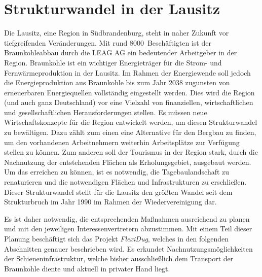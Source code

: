 \section{Strukturwandel in der Lausitz}

Die Lausitz, eine Region in Südbrandenburg, steht in naher Zukunft vor tiefgreifenden Veränderungen. Mit rund 8000~Beschäftigten \cite{noauthor_braunkohle_nodate} ist der Braunkohleabbau durch die LEAG AG ein bedeutender Arbeitgeber in der Region. Braunkohle ist ein wichtiger Energieträger für die Strom- und Fernwärmeproduktion in der Lausitz. Im Rahmen der Energiewende soll jedoch die Energieproduktion aus Braunkohle bis zum Jahr 2038 zugunsten von erneuerbaren Energiequellen vollständig eingestellt werden. Dies wird die Region (und auch ganz Deutschland) vor eine Vielzahl von finanziellen, wirtschaftlichen und gesellschaftlichen Herausforderungen stellen. Es müssen neue Wirtschaftskonzepte für die Region entwickelt werden, um diesen Strukturwandel zu bewältigen. Dazu zählt zum einen eine Alternative für den Bergbau zu finden, um den vorhandenen Arbeitnehmern weiterhin Arbeitsplätze zur Verfügung stellen zu können. Zum anderen soll der Tourismus in der Region stark, durch die Nachnutzung der entstehenden Flächen als Erholungsgebiet, ausgebaut werden. Um das erreichen zu können, ist es notwendig, die Tagebaulandschaft zu renaturieren \cite{btu_flexidug_2022} und die notwendigen Flächen und Infrastrukturen zu erschließen. Dieser Strukturwandel stellt für die Lausitz den größten Wandel seit dem Strukturbruch im Jahr 1990 im Rahmen der Wiedervereinigung dar.

Es ist daher notwendig, die entsprechenden Maßnahmen ausreichend zu planen und mit den jeweiligen Interessenvertretern abzustimmen. Mit einem Teil dieser Planung beschäftigt sich das Projekt \emph{FlexiDug}, welches in den folgenden Abschnitten genauer beschrieben wird. Es erkundet Nachnutzungsmöglichkeiten der Schieneninfrastruktur, welche bisher ausschließlich dem Transport der Braunkohle diente und aktuell in privater Hand liegt.